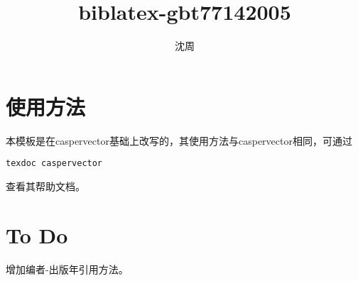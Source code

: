 \documentclass{ctexart}
\title{biblatex-gbt77142005}
\author{沈周}
\begin{document}
\maketitle
\section{使用方法}
本模板是在caspervector基础上改写的，其使用方法与caspervector相同，可通过
\begin{verbatim}
texdoc caspervector
\end{verbatim}
查看其帮助文档。
\section{To Do}
增加编者-出版年引用方法。
\nocite{*}
\printbibliography[title={参考文献},heading=bibintoc]
\end{document}

